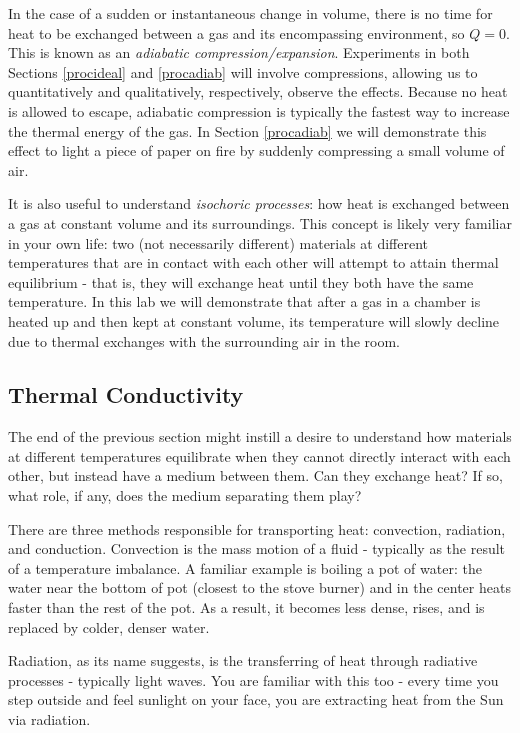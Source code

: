 In the case of a sudden or instantaneous change in volume, there is no time for heat to be exchanged between a gas and its encompassing environment, so $Q=0$.  This is known as an \textit{adiabatic compression/expansion}.  Experiments in both Sections \ref{procideal} and \ref{procadiab} will involve compressions, allowing us to quantitatively and qualitatively, respectively, observe the effects.  Because no heat is allowed to escape, adiabatic compression is typically the fastest way to increase the thermal energy of the gas.  In Section \ref{procadiab} we will demonstrate this effect to light a piece of paper on fire by suddenly compressing a small volume of air.\myskip

It is also useful to understand \textit{isochoric processes}: how heat is exchanged between a gas at constant volume and its surroundings.  This concept is likely very familiar in your own life: two (not necessarily different) materials at different temperatures that are in contact with each other will attempt to attain thermal equilibrium - that is, they will exchange heat until they both have the same temperature.  In this lab we will demonstrate that after a gas in a chamber is heated up and then kept at constant volume, its temperature will slowly decline due to thermal exchanges with the surrounding air in the room.\myskip

\subsection{Thermal Conductivity}
The end of the previous section might instill a desire to understand how materials at different temperatures equilibrate when they cannot directly interact with each other, but instead have a medium between them.  Can they exchange heat?  If so, what role, if any, does the medium separating them play?\myskip

There are three methods responsible for transporting heat: convection, radiation, and conduction.   Convection is the mass motion of a fluid - typically as the result of a temperature imbalance.  A familiar example is boiling a pot of water: the water near the bottom of pot (closest to the stove burner) and in the center heats faster than the rest of the pot.  As a result, it becomes less dense, rises, and is replaced by colder, denser water.\myskip

Radiation, as its name suggests, is the transferring of heat through radiative processes - typically light waves.  You are familiar with this too - every time you step outside and feel sunlight on your face, you are extracting heat from the Sun via radiation.\myskip

